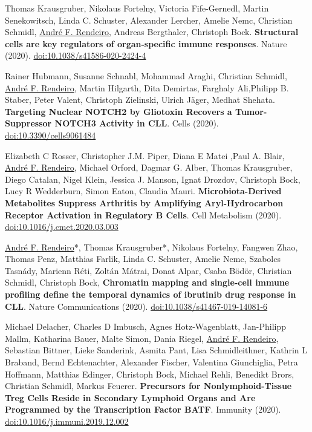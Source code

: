 \documentclass[11pt,a4paper,roman]{moderncv} %
\begin{document}
\begin{etaremune}[leftmargin=1.0cm, itemindent=0pt, topsep=10pt, itemsep=2pt, partopsep=0pt, parsep=0pt]
        \item Thomas Krausgruber, Nikolaus Fortelny, Victoria Fife-Gernedl, Martin Senekowitsch, Linda C. Schuster, Alexander Lercher, Amelie Nemc, Christian Schmidl, \underline{André F. Rendeiro}, Andreas Bergthaler, Christoph Bock. \textbf{Structural cells are key regulators of organ-specific immune responses}. Nature (2020).
        \href{https://dx.doi.org/10.1038/s41586-020-2424-4}{doi:10.1038/s41586-020-2424-4}

        \item Rainer Hubmann, Susanne Schnabl, Mohammad Araghi, Christian Schmidl, \underline{André F. Rendeiro}, Martin Hilgarth, Dita Demirtas, Farghaly Ali,Philipp B. Staber, Peter Valent, Christoph Zielinski, Ulrich Jäger, Medhat Shehata. \textbf{Targeting Nuclear NOTCH2 by Gliotoxin Recovers a Tumor-Suppressor NOTCH3 Activity in CLL}. Cells (2020).
        \href{http://dx.doi.org/10.3390/cells9061484}{doi:10.3390/cells9061484}

        \item Elizabeth C Rosser, Christopher J.M. Piper, Diana E Matei ,Paul A. Blair, \underline{André F. Rendeiro}, Michael Orford, Dagmar G. Alber, Thomas Krausgruber, Diego Catalan, Nigel Klein, Jessica J. Manson, Ignat Drozdov, Christoph Bock, Lucy R Wedderburn, Simon Eaton, Claudia Mauri. \textbf{Microbiota-Derived Metabolites Suppress Arthritis by Amplifying Aryl-Hydrocarbon Receptor Activation in Regulatory B Cells}. Cell Metabolism (2020).
        \href{https://dx.doi.org/10.1016/j.cmet.2020.03.003}{doi:10.1016/j.cmet.2020.03.003}

        \item \underline{André F. Rendeiro}*, Thomas Krausgruber*, Nikolaus Fortelny, Fangwen Zhao, Thomas Penz, Matthias Farlik, Linda C. Schuster, Amelie Nemc, Szabolcs Tasnády, Marienn Réti, Zoltán Mátrai, Donat Alpar, Csaba Bödör, Christian Schmidl, Christoph Bock, \textbf{Chromatin mapping and single-cell immune profiling define the temporal dynamics of ibrutinib drug response in CLL}. Nature Communications (2020).
        \href{https://dx.doi.org/10.1038/s41467-019-14081-6}{doi:10.1038/s41467-019-14081-6}

        \item Michael Delacher, Charles D Imbusch, Agnes Hotz-Wagenblatt, Jan-Philipp Mallm, Katharina Bauer, Malte Simon, Dania Riegel, \underline{André F. Rendeiro}, Sebastian Bittner, Lieke Sanderink, Asmita Pant, Lisa Schmidleithner, Kathrin L Braband, Bernd Echtenachter, Alexander Fischer, Valentina Giunchiglia, Petra Hoffmann, Matthias Edinger, Christoph Bock, Michael Rehli, Benedikt Brors, Christian Schmidl, Markus Feuerer. \textbf{Precursors for Nonlymphoid-Tissue Treg Cells Reside in Secondary Lymphoid Organs and Are Programmed by the Transcription Factor BATF}. Immunity (2020).
        \href{https://dx.doi.org/doi:10.1016/j.immuni.2019.12.002}{doi:10.1016/j.immuni.2019.12.002}


\end{etaremune}
\end{document}
